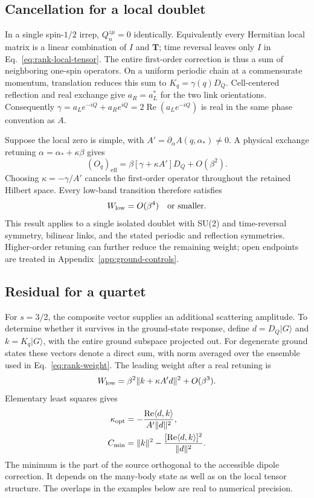 \subsection{Cancellation for a local doublet}

In a single spin-$1/2$ irrep, $Q_n^{z\mu}=0$ identically. Equivalently every
Hermitian local matrix is a linear combination of $I$ and $\bm T$; time
reversal leaves only $I$ in Eq.~\eqref{eq:rank-local-tensor}.
The entire first-order correction is thus a sum of neighboring one-spin
operators. On a uniform periodic chain at a commensurate momentum, translation
reduces this sum to $K_q=\gamma(q)D_Q$. Cell-centered reflection and real
exchange give $a_R=a_L^*$ for the two link orientations. Consequently
$\gamma=a_L e^{-iQ}+a_R e^{iQ}=2\operatorname{Re}(a_L e^{-iQ})$
is real in the same phase convention as $A$.

Suppose the local zero is simple, with
$A'=\partial_\alpha A(q,\alpha_*)\ne0$. A physical exchange retuning
$\alpha=\alpha_*+\kappa\beta$ gives
\begin{equation}
 (O_q)_{\mathrm{eff}}
   =\beta[\gamma+\kappa A']D_Q+O(\beta^2).
\end{equation}
Choosing $\kappa=-\gamma/A'$ cancels the first-order operator throughout
the retained Hilbert space. Every low-band transition therefore satisfies
\begin{equation}
 W_{\mathrm{low}}=O(\beta^4)\quad\text{or smaller}.
 \label{eq:rank-doublet}
\end{equation}
This result applies to a single isolated doublet with SU(2) and
time-reversal symmetry, bilinear links, and the stated periodic and
reflection symmetries. Higher-order retuning can further reduce the
remaining weight; open endpoints are treated in
Appendix~\ref{app:ground-controls}.

\subsection{Residual for a quartet}

For $s=3/2$, the composite vector supplies an additional scattering
amplitude. To determine whether it survives in the ground-state response,
define $d=D_Q|G\rangle$ and
$k=K_q|G\rangle$, with the entire ground subspace projected out.
For degenerate ground states these vectors denote a direct sum, with norm
averaged over the ensemble used in Eq.~\eqref{eq:rank-weight}.
The leading weight after a real retuning is
\begin{equation}
 W_{\mathrm{low}}=\beta^2\|k+\kappa A'd\|^2+O(\beta^3).
\end{equation}
Elementary least squares gives
\begin{align}
 \kappa_{\mathrm{opt}}
   &=-\frac{\operatorname{Re}\langle d,k\rangle}{A'\|d\|^2},\\
 C_{\mathrm{min}}&=\|k\|^2-
       \frac{[\operatorname{Re}\langle d,k\rangle]^2}{\|d\|^2}.
 \label{eq:rank-minimum}
\end{align}
The minimum is the part of the source orthogonal to the accessible
dipole correction. It depends on the many-body state as well as on the
local tensor structure. The overlaps in the examples below are real to
numerical precision.

